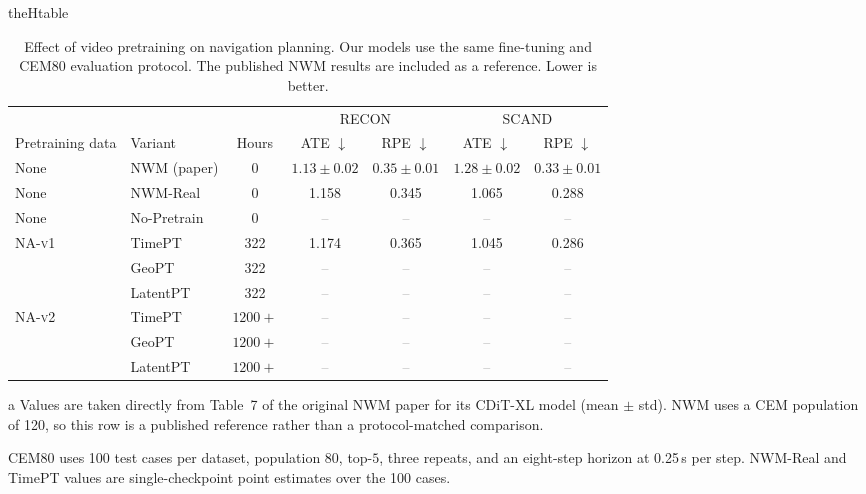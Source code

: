 \documentclass{article}
\newcommand{\TBD}{\textcolor{gray}{--}}
\newcommand{\NAvOne}{\textsc{NA-v1}}
\newcommand{\NAvTwo}{\textsc{NA-v2}}
\newcommand{\tablepart}[1]{%
  \renewcommand{\thetable}{\arabic{table}#1}%
  \ifcsname theHtable\endcsname
    \renewcommand{\theHtable}{\arabic{table}.#1}%
  \fi
}
\newcommand{\continuedtablepart}[1]{%
  \addtocounter{table}{-1}%
  \tablepart{#1}%
}
\begin{document}
\begin{table}[t]
  \continuedtablepart{b}
  \caption{Effect of video pretraining on navigation planning. Our models use
  the same fine-tuning and CEM80 evaluation protocol. The published NWM results
  are included as a reference. Lower is better.}
  \label{tab:pretraining_planning}
  \centering
  \small
  \setlength{\tabcolsep}{7pt}
  \renewcommand{\arraystretch}{1.06}
  \begin{threeparttable}
    \begin{tabular}{llc cc cc}
      \toprule
      & & & \multicolumn{2}{c}{RECON} & \multicolumn{2}{c}{SCAND} \\
      \cmidrule(lr){4-5}\cmidrule(l){6-7}
      Pretraining data & Variant & Hours
      & ATE $\downarrow$ & RPE $\downarrow$
      & ATE $\downarrow$ & RPE $\downarrow$ \\
      \midrule
      None & NWM (paper)\tnote{a} & 0
      & $1.13{\pm}0.02$ & $0.35{\pm}0.01$
      & $1.28{\pm}0.02$ & $0.33{\pm}0.01$ \\
      \midrule
      None & NWM-Real & 0 & 1.158 & 0.345 & 1.065 & 0.288 \\
      \midrule
      None & No-Pretrain & 0 & \TBD & \TBD & \TBD & \TBD \\
      \midrule
      \multirow{3}{*}{\NAvOne{}}
      & TimePT & 322 & 1.174 & 0.365 & 1.045 & 0.286 \\
      & GeoPT & 322 & \TBD & \TBD & \TBD & \TBD \\
      & LatentPT & 322 & \TBD & \TBD & \TBD & \TBD \\
      \midrule
      \multirow{3}{*}{\NAvTwo{}}
      & TimePT & $1200{+}$ & \TBD & \TBD & \TBD & \TBD \\
      & GeoPT & $1200{+}$ & \TBD & \TBD & \TBD & \TBD \\
      & LatentPT & $1200{+}$ & \TBD & \TBD & \TBD & \TBD \\
      \bottomrule
    \end{tabular}
    \begin{tablenotes}[flushleft]\footnotesize
      \item[a] Values are taken directly from Table~7 of the original NWM paper
      for its CDiT-XL model (mean $\pm$ std). NWM uses a CEM population of 120,
      so this row is a published reference rather than a protocol-matched
      comparison.
      \item CEM80 uses 100 test cases per dataset, population 80, top-$5$,
      three repeats, and an eight-step horizon at 0.25\,s per step.
      NWM-Real and TimePT values are single-checkpoint point estimates over the
      100 cases.
    \end{tablenotes}
  \end{threeparttable}
\end{table}
\end{document}
